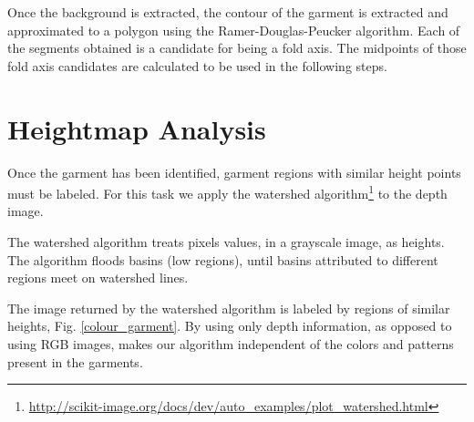 Once the background is extracted, the contour of the garment is extracted and approximated to a polygon using the Ramer-Douglas-Peucker algorithm. Each of the segments obtained is a candidate for being a fold axis. The midpoints of those fold axis candidates are calculated to be used in the following steps.


\section{Heightmap Analysis}
Once the garment has been identified, garment regions with similar height points must be labeled. For this task we apply the watershed algorithm\footnote{\url{http://scikit-image.org/docs/dev/auto_examples/plot_watershed.html}}  to the depth image. 

The watershed algorithm treats pixels values, in a grayscale image, as heights. The algorithm floods basins (low regions), until basins attributed to different regions meet on watershed lines. 

%
%

The image returned by the watershed algorithm is labeled by regions of similar heights, Fig. \ref{colour_garment}. By using only depth information, as opposed to using RGB images, makes our algorithm independent of the colors and patterns present in the garments.


